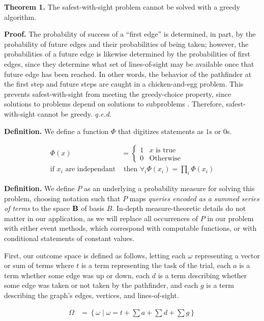 \documentclass{article}
\begin{document}
\textbf{Theorem 1.} The safest-with-sight problem cannot be solved with
a greedy algorithm.

\textbf{Proof.} The probability of success of a ``first edge'' is
determined, in part, by the probability of future edges and their
probabilities of being taken; however, the probabilities of a future
edge is likewise determined by the probabilities of first edges, since
they determine what set of lines-of-sight may be available once that
future edge has been reached. In other words, the behavior of the
pathfinder at the first step and future steps are caught in a
chicken-and-egg problem. This prevents safest-with-sight from meeting
the greedy-choice property, since solutions to problems depend on
solutions to subproblems \cite{cormen90}. Therefore, safest-with-sight
cannot be greedy. \emph{q.e.d.}

\textbf{Definition.} We define a function $\Phi$ that digitizes
statements as $1$s or $0$s.

\begin{align}
    \Phi(x) &= \begin{cases}
        1 & x \text{ is true} \\
        0 & \text{Otherwise}
    \end{cases}\\
    \text{if } x_i \text{ are independant} &\text{ then } \forall_i \Phi(x_i) = \prod_i \Phi(x_i)
\end{align}

\textbf{Definition.} We define $P$ as an underlying a probability
measure for solving this problem, choosing notation such that $P$ maps
\emph{queries encoded as a summed series of terms} to the space
${\bf B}$ of basis $B$. In-depth measure-theoretic details do not matter
in our application, as we will replace all occurrences of $P$ in our
problem with either event methods, which correspond with computable
functions, or with conditional statements of constant values.

First, our outcome space is defined as follows, letting each $\omega$
representing a vector or sum of terms where $t$ is a term representing
the task of the trial, each $a$ is a term whether some edge was up or
down, each $d$ is a term describing whether some edge was taken or not
taken by the pathfinder, and each $g$ is a term describing the graph's
edges, vertices, and lines-of-sight.

\begin{align}
    \Omega &= \left\{ \omega \mid \omega = t + \sum a + \sum d + \sum g \right\}
\end{align}
\end{document}
